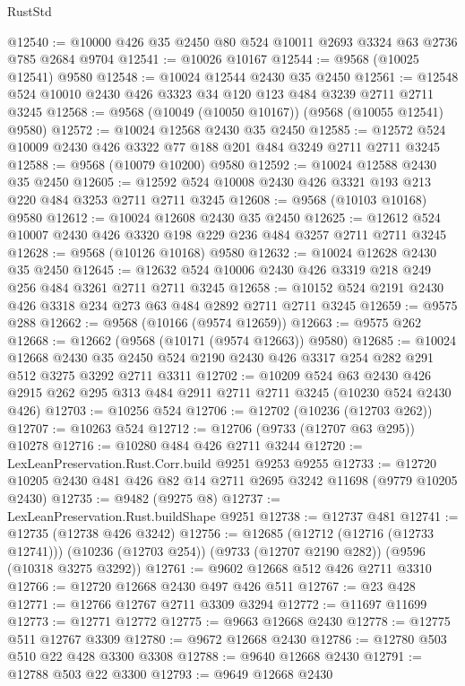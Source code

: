 \begin{lexlean}{RustStd}
\begin{coremodule}
{\begin{coremodule}
{{{{{{{{{{{{{{{{{{{{{{{{{{{{{{{{{{{{{{{{{{{{{{{{{{{{{{{@12540 := @10000 @426 @35 @2450 @80 @524 @10011 @2693 @3324 @63 @2736 @785 @2684 @9704
@12541 := @10026 @10167
@12544 := @9568 (@10025 @12541) @9580
@12548 := @10024 @12544 @2430 @35 @2450
@12561 := @12548 @524 @10010 @2430 @426 @3323 @34 @120 @123 @484 @3239 @2711 @2711 @3245
@12568 := @9568 (@10049 (@10050 @10167)) (@9568 (@10055 @12541) @9580)
@12572 := @10024 @12568 @2430 @35 @2450
@12585 := @12572 @524 @10009 @2430 @426 @3322 @77 @188 @201 @484 @3249 @2711 @2711 @3245
@12588 := @9568 (@10079 @10200) @9580
@12592 := @10024 @12588 @2430 @35 @2450
@12605 := @12592 @524 @10008 @2430 @426 @3321 @193 @213 @220 @484 @3253 @2711 @2711 @3245
@12608 := @9568 (@10103 @10168) @9580
@12612 := @10024 @12608 @2430 @35 @2450
@12625 := @12612 @524 @10007 @2430 @426 @3320 @198 @229 @236 @484 @3257 @2711 @2711 @3245
@12628 := @9568 (@10126 @10168) @9580
@12632 := @10024 @12628 @2430 @35 @2450
@12645 := @12632 @524 @10006 @2430 @426 @3319 @218 @249 @256 @484 @3261 @2711 @2711 @3245
@12658 := @10152 @524 @2191 @2430 @426 @3318 @234 @273 @63 @484 @2892 @2711 @2711 @3245
@12659 := @9575 @288
@12662 := @9568 (@10166 (@9574 @12659))
@12663 := @9575 @262
@12668 := @12662 (@9568 (@10171 (@9574 @12663)) @9580)
@12685 := @10024
    @12668
    @2430
    @35
    @2450
    @524
    @2190
    @2430
    @426
    @3317
    @254
    @282
    @291
    @512
    @3275
    @3292
    @2711
    @3311
@12702 := @10209
    @524
    @63
    @2430
    @426
    @2915
    @262
    @295
    @313
    @484
    @2911
    @2711
    @2711
    @3245
    (@10230 @524 @2430 @426)
@12703 := @10256 @524
@12706 := @12702 (@10236 (@12703 @262))
@12707 := @10263 @524
@12712 := @12706 (@9733 (@12707 @63 @295)) @10278
@12716 := @10280 @484 @426 @2711 @3244
@12720 := LexLeanPreservation.Rust.Corr.build @9251 @9253 @9255
@12733 := @12720 @10205 @2430 @481 @426 @82 @14 @2711 @2695 @3242 @11698 (@9779 @10205 @2430)
@12735 := @9482 (@9275 @8)
@12737 := LexLeanPreservation.Rust.buildShape @9251
@12738 := @12737 @481
@12741 := @12735 (@12738 @426 @3242)
@12756 := @12685
    (@12712 (@12716 (@12733 @12741)))
    (@10236 (@12703 @254))
    (@9733 (@12707 @2190 @282))
    (@9596 (@10318 @3275 @3292))
@12761 := @9602 @12668 @512 @426 @2711 @3310
@12766 := @12720 @12668 @2430 @497 @426 @511
@12767 := @23 @428
@12771 := @12766 @12767 @2711 @3309 @3294
@12772 := @11697 @11699
@12773 := @12771 @12772
@12775 := @9663 @12668 @2430
@12778 := @12775 @511 @12767 @3309
@12780 := @9672 @12668 @2430
@12786 := @12780 @503 @510 @22 @428 @3300 @3308
@12788 := @9640 @12668 @2430
@12791 := @12788 @503 @22 @3300
@12793 := @9649 @12668 @2430
}}}}}}}}}}}}}}}}}}}}}}}}}}}}}}}}}}}}}}}}}}}}}}}}}}}}}}}
\end{coremodule}}
\end{coremodule}
\end{lexlean}
